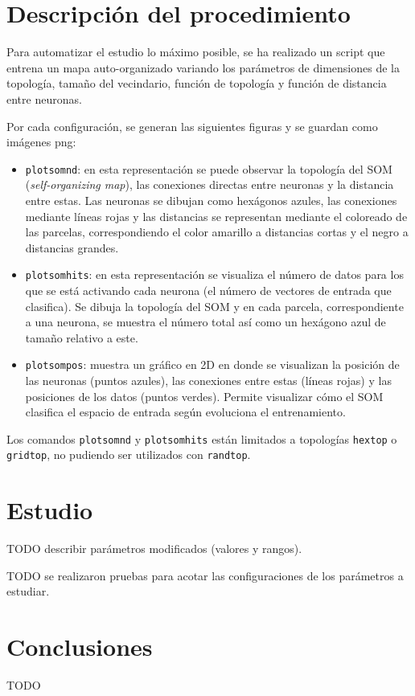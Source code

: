 \documentclass[a4paper,12pt,titlepage]{article}
\begin{document}
\section{Descripción del procedimiento}

Para automatizar el estudio lo máximo posible, se ha realizado un script que entrena un mapa auto-organizado variando los parámetros de dimensiones de la topología, tamaño del vecindario, función de topología y función de distancia entre neuronas. 

Por cada configuración, se generan las siguientes figuras y se guardan como imágenes png:

\begin{itemize}[noitemsep]
	\item \lstinline|plotsomnd|: en esta representación se puede observar la topología del SOM (\textit{self-organizing map}), las conexiones directas entre neuronas y la distancia entre estas. Las neuronas se dibujan como hexágonos azules, las conexiones mediante líneas rojas y las distancias se representan mediante el coloreado de las parcelas, correspondiendo el color amarillo a distancias cortas y el negro a distancias grandes. \citep{matlab:plotsomnd}
	\item \lstinline|plotsomhits|: en esta representación se visualiza el número de datos para los que se está activando cada neurona (el número de vectores de entrada que clasifica). Se dibuja la topología del SOM y en cada parcela, correspondiente a una neurona, se muestra el número total así como un hexágono azul de tamaño relativo a este. \citep{matlab:plotsomhits}
	\item \lstinline|plotsompos|: muestra un gráfico en 2D en donde se visualizan la posición de las neuronas (puntos azules), las conexiones entre estas (líneas rojas) y las posiciones de los datos (puntos verdes). Permite visualizar cómo el SOM clasifica el espacio de entrada según evoluciona el entrenamiento. \citep{matlab:plotsompos}
\end{itemize}

Los comandos \lstinline|plotsomnd| y \lstinline|plotsomhits| están limitados a topologías \lstinline|hextop| o \lstinline|gridtop|, no pudiendo ser utilizados con \lstinline|randtop|. 



\section{Estudio}

TODO describir parámetros modificados (valores y rangos).

TODO se realizaron pruebas para acotar las configuraciones de los parámetros a estudiar.

\section{Conclusiones}

TODO



\newpage


\end{document}
